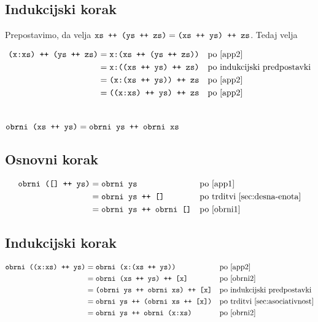 \documentclass[11pt,a4paper]{article}
\begin{document}
\subsection*{Indukcijski korak}

Prepostavimo, da velja $\mbox{\texttt{xs ++ (ys ++ zs)}} = \mbox{\texttt{(xs ++ ys) ++ zs}}$. Tedaj velja

\begin{align*}
  \mbox{\texttt{(x:xs) ++ (ys ++ zs)}}
  &= \mbox{\texttt{x:(xs ++ (ys ++ zs))}}
    &&\text{po \eqref{app2}} \\
  &= \mbox{\texttt{x:((xs ++ ys) ++ zs)}}
    &&\text{po indukcijski predpostavki} \\
  &= \mbox{\texttt{(x:(xs ++ ys)) ++ zs}}
    &&\text{po \eqref{app2}} \\
  &= \mbox{\texttt{((x:xs) ++ ys) ++ zs}}
    &&\text{po \eqref{app2}}
\end{align*}


\section{$\mbox{\texttt{obrni (xs ++ ys)}} = \mbox{\texttt{obrni ys ++ obrni xs}}$}

\subsection*{Osnovni korak}

\begin{align*}
  \mbox{\texttt{obrni ([] ++ ys)}}
  &= \mbox{\texttt{obrni ys}}
    &&\text{po \eqref{app1}} \\
  &= \mbox{\texttt{obrni ys ++ []}}
    &&\text{po trditvi~\ref{sec:desna-enota}} \\
  &= \mbox{\texttt{obrni ys ++ obrni []}}
    &&\text{po \eqref{obrni1}}
\end{align*}

\subsection*{Indukcijski korak}

\begin{align*}
  \mbox{\texttt{obrni ((x:xs) ++ ys)}}
  &= \mbox{\texttt{obrni (x:(xs ++ ys))}}
    &&\text{po \eqref{app2}} \\
  &= \mbox{\texttt{obrni (xs ++ ys) ++ [x]}}
    &&\text{po \eqref{obrni2}} \\
  &= \mbox{\texttt{(obrni ys ++ obrni xs) ++ [x]}}
    &&\text{po indukcijski predpostavki} \\
  &= \mbox{\texttt{obrni ys ++ (obrni xs ++ [x])}}
    &&\text{po trditvi~\ref{sec:asociativnost}} \\
  &= \mbox{\texttt{obrni ys ++ obrni (x:xs)}}
    &&\text{po \eqref{obrni2}}
\end{align*}
\end{document}
